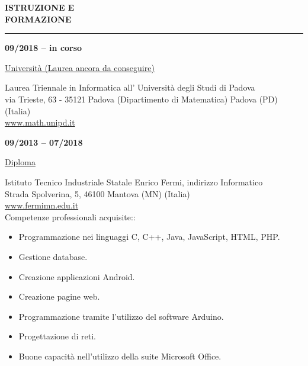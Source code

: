 \begin{minipage}[b]{0.3\textwidth}
	\textbf{ISTRUZIONE E \\FORMAZIONE}
\end{minipage}%
\hfill
\hfill
\begin{minipage}[t]{0.6\textwidth}		
	\rule{\textwidth}{0.4pt}
\end{minipage}%
\vspace{5mm}



\begin{minipage}[t]{0.3\textwidth}
	\textbf{09/2018 – in corso}
\end{minipage}%
\hfill
\hfill
\begin{minipage}[t]{0.6\textwidth}		
	\begin{Large}
		\underline{Università (Laurea ancora da conseguire)} \vspace{5mm}\\
	\end{Large}
	Laurea Triennale in Informatica all' Università degli Studi di Padova\\
	via Trieste, 63 - 35121 Padova (Dipartimento di Matematica) Padova (PD) (Italia) \\
	\url{www.math.unipd.it} 
	\vspace{4mm}
\end{minipage}%


\begin{minipage}[t]{0.3\textwidth}
	\textbf{09/2013 – 07/2018}
\end{minipage}%
\hfill
\hfill
\begin{minipage}[t]{0.6\textwidth}		
	\begin{Large}
		\underline{Diploma} \vspace{5mm}\\
	\end{Large}
	Istituto Tecnico Industriale Statale Enrico Fermi, indirizzo Informatico\\
	Strada Spolverina, 5, 46100 Mantova (MN) (Italia) \\
	\url{www.fermimn.edu.it} \vspace{1mm}\\
	Competenze professionali acquisite::
	\begin{itemize}
		\item Programmazione nei linguaggi C, C++, Java, JavaScript, HTML, PHP.
		\item Gestione database.
		\item  Creazione applicazioni Android.
		\item Creazione pagine web.
		\item Programmazione tramite l'utilizzo del software Arduino.
		\item  Progettazione di reti.
		\item Buone capacità nell'utilizzo della suite Microsoft Office.
	\end{itemize} 
	\vspace{4mm}
\end{minipage}%